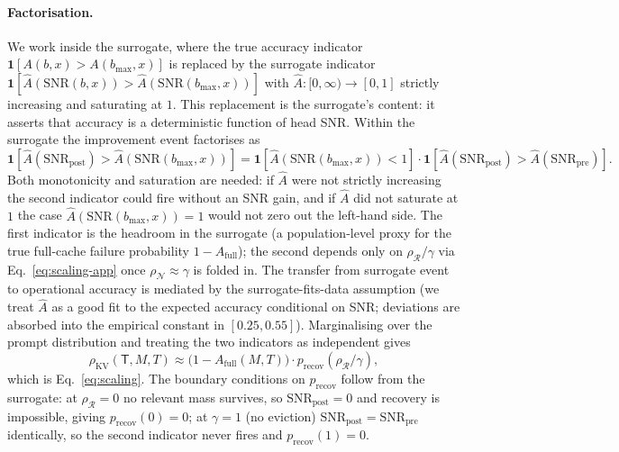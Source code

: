 \documentclass{article} %
\begin{document}
\paragraph{Factorisation.} We work inside the surrogate, where the
true accuracy indicator $\mathbf{1}[A(b, x) > A(b_{\max}, x)]$ is replaced
by the surrogate indicator
$\mathbf{1}[\hat A(\mathrm{SNR}(b, x)) > \hat A(\mathrm{SNR}(b_{\max}, x))]$
with $\hat A: [0, \infty) \to [0, 1]$ strictly increasing and saturating at
$1$. This replacement is the surrogate's content: it asserts that accuracy
is a deterministic function of head SNR. Within the surrogate the
improvement event factorises as
\[
\mathbf{1}[\hat A(\mathrm{SNR}_{\mathrm{post}}) > \hat A(\mathrm{SNR}(b_{\max}, x))]
= \mathbf{1}[\hat A(\mathrm{SNR}(b_{\max}, x)) < 1] \cdot
\mathbf{1}[\hat A(\mathrm{SNR}_{\mathrm{post}}) > \hat A(\mathrm{SNR}_{\mathrm{pre}})].
\]
Both monotonicity and saturation are needed: if $\hat A$ were not strictly
increasing the second indicator could fire without an SNR gain, and if
$\hat A$ did not saturate at $1$ the case $\hat A(\mathrm{SNR}(b_{\max}, x)) = 1$
would not zero out the left-hand side. The first indicator is the headroom
in the surrogate (a population-level proxy for the true full-cache failure
probability $1 - A_{\mathrm{full}}$); the second depends only on
$\rho_{\mathcal{R}}/\gamma$ via Eq.~\eqref{eq:scaling-app} once
$\rho_{\mathcal{N}} \approx \gamma$ is folded in. The transfer from
surrogate event to operational accuracy is mediated by the
surrogate-fits-data assumption (we treat $\hat A$ as a good fit to the
expected accuracy conditional on SNR; deviations are absorbed into the
empirical constant in $[0.25, 0.55]$). Marginalising over the prompt
distribution and treating the two indicators as independent gives
\[
\rho_{\mathrm{KV}}(\mathsf{T}, M, T) \approx
\bigl(1 - A_{\mathrm{full}}(M, T)\bigr) \cdot
p_{\mathrm{recov}}(\rho_{\mathcal{R}} / \gamma),
\]
which is Eq.~\eqref{eq:scaling}. The boundary conditions on $p_{\mathrm{recov}}$
follow from the surrogate: at $\rho_{\mathcal{R}} = 0$ no relevant mass
survives, so $\mathrm{SNR}_{\mathrm{post}} = 0$ and recovery is impossible,
giving $p_{\mathrm{recov}}(0) = 0$; at $\gamma = 1$ (no eviction)
$\mathrm{SNR}_{\mathrm{post}} = \mathrm{SNR}_{\mathrm{pre}}$ identically, so
the second indicator never fires and $p_{\mathrm{recov}}(1) = 0$.
\end{document}
